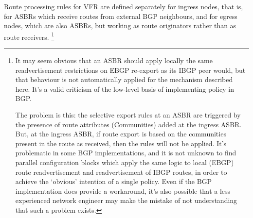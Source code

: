 Route processing rules for VFR are defined separately for ingress nodes, that is, for ASBRs which receive routes from external BGP neighbours, and for egress nodes, which are also ASBRs, but working as route originators rather than as route receivers.
\footnote{It may seem obvious that an ASBR should apply locally the same readvertisement restrictions on EBGP re-export as its IBGP peer would, but that behaviour is not automatically applied for the mechanism described here.  It's a valid criticism of the low-level basis of implementing policy in BGP.

	The problem is this: the selective export rules at an ASBR are triggered by the presence of route attributes (Communities) added at the ingress ASBR.  But, at the ingress ASBR, if route export is based on the communities present in the route as received, then the rules will not be applied.  It's problematic in some BGP implementations, and it is not unknown to find parallel configuration blocks which apply the same logic to local (EBGP) route readvertisement and readvertisement of IBGP routes, in order to achieve the `obvious' intention of a single policy.  Even if the BGP implementation does provide a workaround, it's also possible that a less experienced network engineer may make the mistake of not understanding that such a problem exists.}

